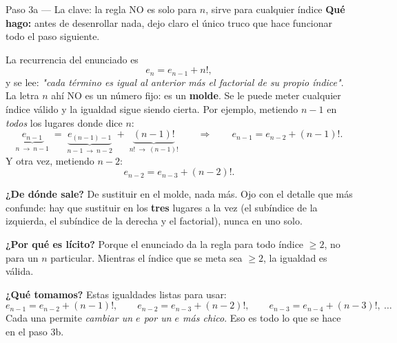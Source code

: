 \documentclass[11pt]{article}
\begin{document}
\begin{paso}{Paso 3a --- La clave: la regla NO es solo para $n$, sirve para cualquier índice}
\textbf{Qué hago:} antes de desenrollar nada, dejo claro el único truco que hace funcionar todo el paso siguiente.

La recurrencia del enunciado es
\[
e_n = e_{n-1} + n! ,
\]
y se lee: \emph{"cada término es igual al anterior más el factorial de su propio índice"}. La letra $n$ ahí NO es un número fijo: es un \textbf{molde}. Se le puede meter cualquier índice válido y la igualdad sigue siendo cierta. Por ejemplo, metiendo $n-1$ en \emph{todos} los lugares donde dice $n$:
\[
\underbrace{e_{n-1}}_{n\ \to\ n-1} \;=\; \underbrace{e_{(n-1)-1}}_{n-1\ \to\ n-2} \;+\; \underbrace{(n-1)!}_{n!\ \to\ (n-1)!}
\qquad\Longrightarrow\qquad
e_{n-1} = e_{n-2} + (n-1)! .
\]
Y otra vez, metiendo $n-2$:
\[
e_{n-2} = e_{n-3} + (n-2)! .
\]

\textbf{¿De dónde sale?} De sustituir en el molde, nada más. Ojo con el detalle que más confunde: hay que sustituir en los \textbf{tres} lugares a la vez (el subíndice de la izquierda, el subíndice de la derecha y el factorial), nunca en uno solo.

\textbf{¿Por qué es lícito?} Porque el enunciado da la regla para todo índice $\ge 2$, no para un $n$ particular. Mientras el índice que se meta sea $\ge 2$, la igualdad es válida.

\textbf{¿Qué tomamos?} Estas igualdades listas para usar:
\[
e_{n-1} = e_{n-2} + (n-1)!,\qquad
e_{n-2} = e_{n-3} + (n-2)!,\qquad
e_{n-3} = e_{n-4} + (n-3)!,\ \dots
\]
Cada una permite \emph{cambiar un $e$ por un $e$ más chico}. Eso es todo lo que se hace en el paso 3b.
\end{paso}
\end{document}
